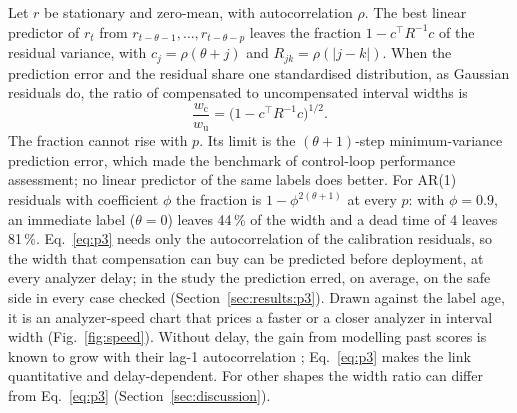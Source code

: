 Let $r$ be stationary and zero-mean, with autocorrelation $\rho$. The best linear predictor of
$r_t$ from $r_{t-\theta-1}, \dots, r_{t-\theta-p}$ leaves the fraction $1 - c^{\top}R^{-1}c$ of the
residual variance, with $c_j = \rho(\theta+j)$ and $R_{jk} = \rho(|j-k|)$. When the prediction
error and the residual share one standardised distribution, as Gaussian residuals do, the ratio
of compensated to uncompensated interval widths is
\begin{equation}
  \frac{w_{\mathrm{c}}}{w_{\mathrm{u}}} = \bigl(1 - c^{\top}R^{-1}c\bigr)^{1/2}.
  \label{eq:p3}
\end{equation}
The fraction cannot rise with $p$. Its limit is the $(\theta+1)$-step minimum-variance prediction
error, which \citet{harris1989} made the benchmark of control-loop performance assessment; no
linear predictor of the same labels does better. For AR(1) residuals with coefficient $\phi$ the
fraction is $1 - \phi^{2(\theta+1)}$ at every $p$: with $\phi = 0.9$, an immediate label
($\theta = 0$) leaves 44\,\% of the width and a dead time of 4 leaves 81\,\%. Eq.~\eqref{eq:p3}
needs only the autocorrelation of the calibration residuals, so the width that compensation can
buy can be predicted before deployment, at every analyzer delay; in the study the prediction
erred, on average, on the safe side in every case checked (Section~\ref{sec:results:p3}). Drawn
against the label age, it is an analyzer-speed chart that prices a faster or a closer analyzer
in interval width (Fig.~\ref{fig:speed}). Without delay, the gain from modelling past scores is
known to grow with their lag-1 autocorrelation \citep{areces2025}; Eq.~\eqref{eq:p3} makes the link
quantitative and delay-dependent. For other shapes the width ratio can differ from
Eq.~\eqref{eq:p3} (Section~\ref{sec:discussion}).
